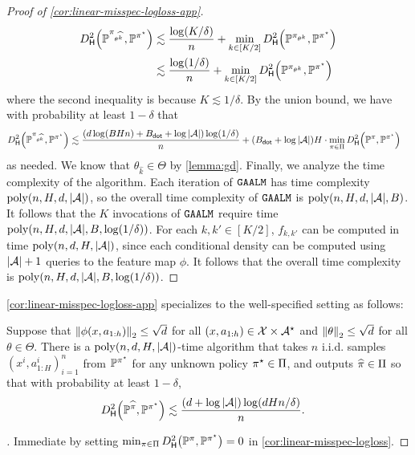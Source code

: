 \begin{proof}[Proof of \cref{cor:linear-misspec-logloss-app}]
\begin{align}
\Dhels{\BP^{\pi_{\theta^{\widehat k}}}}{\BP^{\pistar}} &\lesssim \frac{\log(K/\delta)}{n} + \min_{k\in[K/2]} \Dhels{\BP^{\pi_{\theta^k}}}{\BP^{\pistar}} \\ 
&\lesssim \frac{\log(1/\delta)}{n} + \min_{k\in[K/2]} \Dhels{\BP^{\pi_{\theta^k}}}{\BP^{\pistar}}\end{align}
where the second inequality is because $K \lesssim 1/\delta$. By the union bound, we have with probability at least $1-\delta$ that
\begin{align}
\Dhels{\BP^{\pi_{\theta^{\widehat k}}}}{\BP^{\pistar}} &\lesssim \frac{(d\log(BHn) + \Bdot + \log|\MA|)\log(1/\delta)}{n} + (\Bdot+\log|\MA|)H \cdot \min_{\pi\in\Pi} \Dhels{\BP^\pi}{\BP^{\pistar}}\end{align}
as needed. We know that $\theta_{\widehat k} \in \Theta$ by \cref{lemma:gd}. Finally, we analyze the time complexity of the algorithm. Each iteration of $\texttt{GAALM}$ has time complexity $\mathrm{poly}(n,H,d,|\mathcal{A}|)$, so the overall time complexity of $\texttt{GAALM}$ is $\mathrm{poly}(n,H,d,|\mathcal{A}|,B)$. It follows that the $K$ invocations of $\texttt{GAALM}$ require time $\mathrm{poly}(n,H,d,|\mathcal{A}|,B,\log(1/\delta))$. For each $k,k' \in [K/2]$, $f_{k,k'}$ can be computed in time $\mathrm{poly}(n,d,H,|\mathcal{A}|)$, since each conditional density can be computed using $|\mathcal{A}|+1$ queries to the feature map $\phi$. It follows that the overall time complexity is $\mathrm{poly}(n,H,d,|\mathcal{A}|,B,\log(1/\delta))$.
\end{proof}

\cref{cor:linear-misspec-logloss-app} specializes to the well-specified setting as follows:

\begin{proposition}\label{cor:linear-wellspec-logloss}
Suppose that $\left \lVert \phi(x,a_{1:h}) \right \rVert_2 \leq \sqrt{d}$ for all $(x,a_{1:h}) \in \mathcal{X}\times\mathcal{A}^\star$ and $\left \lVert \theta \right \rVert_2\leq \sqrt{d}$ for all $\theta \in \Theta$. There is a $\mathrm{poly}(n,d,H,|\mathcal{A}|)$-time algorithm that takes $n$ i.i.d. samples $(x^i,a^i_{1:H})_{i=1}^n$ from $\mathbb{P}^{\pi^{\star}}$ for any unknown policy $\pi^{\star} \in \Pi$, and outputs $\widehat{\pi}\in\Pi$ so that with probability at least $1-\delta$,
\begin{align}
\Dhels{\BP^{\pihat}}{\BP^{\pistar}} &\lesssim \frac{(d+\log|\MA|)\log(dHn/\delta)}{n}.\end{align}
\end{proposition}

\begin{proof}[]
Immediate by setting $\min_{\pi\in\Pi} \Dhels{\BP^\pi}{\BP^{\pistar}} = 0$ in \cref{cor:linear-misspec-logloss}.
\end{proof}

